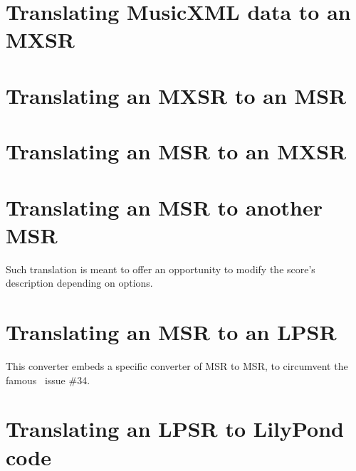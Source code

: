 \section{Translating MusicXML data to an MXSR}


\section{Translating an MXSR to an MSR}


\section{Translating an MSR to an MXSR}


\section{Translating an MSR to another MSR}

Such translation is meant to offer an opportunity to modify the score's description depending on options.


\section{Translating an MSR to an LPSR}

This converter embeds a specific converter of MSR to MSR, to circumvent the famous \lily\ issue \#34.


\section{Translating an LPSR to LilyPond code}


